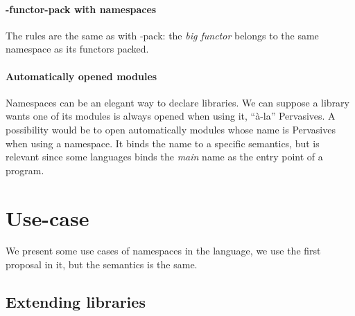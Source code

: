 \documentclass[11pt,a4paper]{article}
\begin{document}
\paragraph{-functor-pack with namespaces}

The rules are the same as with -pack: the \emph{big functor} belongs to the same
namespace as its functors packed.

\paragraph{Automatically opened modules}

Namespaces can be an elegant way to declare libraries. We can suppose a library
wants one of its modules is always opened when using it, ``à-la''
Pervasives. A possibility would be to open automatically modules whose name is
Pervasives when using a namespace. It binds the name to a specific semantics,
but is relevant since some languages binds the \emph{main} name as the entry
point of a program.



\section{Use-case}

We present some use cases of namespaces in the language, we use the first
proposal in it, but the semantics is the same.


\subsection{Extending libraries}
\end{document}

